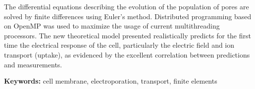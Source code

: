 The differential equations describing the evolution of the population of pores are solved by finite differences using Euler's method.
Distributed programming based on OpenMP was used to maximize the usage of current multithreading processors.
The new theoretical model presented realistically predicts for the first time the electrical response of the cell, particularly the electric field and ion transport (uptake), as evidenced by the excellent correlation between predictions and measurements. 

\bigskip

\noindent\textbf{Keywords:} cell membrane, electroporation, transport, finite elements